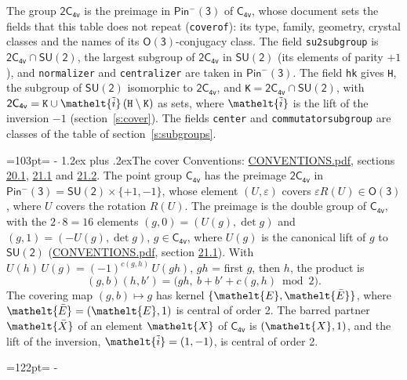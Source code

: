 \documentclass[10pt,a4paper]{article}
\makeatletter
\renewcommand\section{\@startsection{section}{1}{\z@}{-3ex plus -1ex minus -.2ex}%
  {1.2ex plus .2ex}{\normalfont\large\sffamily\bfseries\color{parttitle}}}
\newcommand{\needspace}[1]{\par\penalty-100\begingroup\dimen0=#1\relax\dimen2=\pagegoal
  \advance\dimen2-\pagetotal\ifdim\dimen0>\dimen2\relax\ifdim\dimen2>0pt\vfil\break\fi\fi
  \endgroup}
\numberwithin{equation}{section}
\newcommand{\eltfont}[1]{{\let\sigma\eltsigma\mathelt{#1}}}
\newcommand{\grp}[1]{\mathsf{#1}}
\newcommand{\elt}[1]{\eltfont{#1}}
\newcommand{\dirprod}{\times}
\newcommand{\barred}[1]{\bar{#1}}
\newcommand{\lift}[1]{\tilde{#1}}
\makeatother
\begin{document}
\leavevmode\label{n:element.inversion}\label{n:group.preimage}The group $\grp{2C_{4v}}$ is the preimage in $\grp{Pin^{-}(3)}$ of \href{../../../rotation/data/pdf/C4v.pdf}{$\grp{C_{4v}}$}, whose document sets the fields that this table does not repeat (\texttt{coverof}): its type, family, geometry, crystal classes and the names of its \href{../../../rotation/data/pdf/O3.pdf}{$\grp{O(3)}$}-conjugacy class. The field \texttt{su2subgroup} is $\grp{2C_{4v}} \cap \grp{SU(2)}$, the largest subgroup of $\grp{2C_{4v}}$ in $\grp{SU(2)}$ (its elements of parity $+1$), and \texttt{normalizer} and \texttt{centralizer} are taken in $\grp{Pin^{-}(3)}$. The field \texttt{hk} gives \texttt{H}, the subgroup of $\grp{SU(2)}$ isomorphic to $\grp{2C_{4v}}$, and \texttt{K}${} = \grp{2C_{4v}} \cap \grp{SU(2)}$, with $\grp{2C_{4v}} = \texttt{K} \cup \elt{\lift{i}}\,(\texttt{H} \setminus \texttt{K})$ as sets, where $\elt{\lift{i}}$ is the lift of the inversion $-1$ (section~\ref{s:cover}). The fields \texttt{center} and \texttt{commutatorsubgroup} are classes of the table of section~\ref{s:subgroups}.
\needspace{103pt}
\section{The cover}\label{s:cover}
Conventions: \href{../../CONVENTIONS.pdf}{CONVENTIONS.pdf}, sections \href{../../CONVENTIONS.pdf\#conv.20.1}{20.1}, \href{../../CONVENTIONS.pdf\#conv.21.1}{21.1} and \href{../../CONVENTIONS.pdf\#conv.21.2}{21.2}.
\leavevmode\label{n:group.pin.minus}\label{n:group.su2}\label{n:local.pin.sign}\label{n:matrix.covered}\label{n:matrix.lift.su2}\label{n:index.bar}The point group $\grp{C_{4v}}$ has the preimage $\grp{2C_{4v}}$ in $\grp{Pin^{-}(3)} = \grp{SU(2)} \dirprod \{+1, -1\}$, whose element $(U, \varepsilon)$ covers $\varepsilon R(U) \in \grp{O(3)}$, where $U$ covers the rotation $R(U)$. The preimage is the double group of $\grp{C_{4v}}$, with the $2 \cdot 8 = 16$ elements $(g, 0) = (U(g), \det g)$ and $(g, 1) = (-U(g), \det g)$, $g \in \grp{C_{4v}}$, where $U(g)$ is the canonical lift of $g$ to $\grp{SU(2)}$ (\href{../../CONVENTIONS.pdf}{CONVENTIONS.pdf}, section \href{../../CONVENTIONS.pdf\#conv.21.1}{21.1}). \label{n:function.cocycle}With $U(h)\,U(g) = (-1)^{c(g,h)}\,U(gh)$, $gh$ = first $g$, then $h$, the product is
\begin{equation}\label{e:product}(g, b)(h, b') = \bigl(gh,\ b + b' + c(g, h) \bmod 2\bigr).\end{equation}
\leavevmode\label{n:mark.bar}The covering map $(g, b) \mapsto g$ has kernel $\{\elt{E}, \elt{\barred{E}}\}$, where $\elt{\barred{E}} = (\elt{E}, 1)$ is central of order 2. \label{n:element.named}\label{n:mark.lift}The barred partner $\elt{\barred{X}}$ of an element $\elt{X}$ of $\grp{C_{4v}}$ is $(\elt{X}, 1)$, and the lift of the inversion, $\elt{\lift{i}} = (1, -1)$, is central of order 2.
\needspace{122pt}
\end{document}
